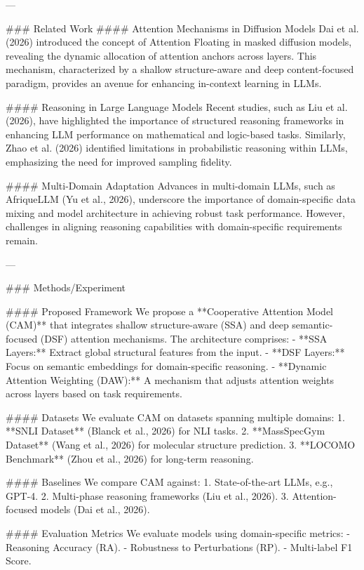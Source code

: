 ---

### Related Work  
#### Attention Mechanisms in Diffusion Models  
Dai et al. (2026) introduced the concept of Attention Floating in masked diffusion models, revealing the dynamic allocation of attention anchors across layers. This mechanism, characterized by a shallow structure-aware and deep content-focused paradigm, provides an avenue for enhancing in-context learning in LLMs.

#### Reasoning in Large Language Models  
Recent studies, such as Liu et al. (2026), have highlighted the importance of structured reasoning frameworks in enhancing LLM performance on mathematical and logic-based tasks. Similarly, Zhao et al. (2026) identified limitations in probabilistic reasoning within LLMs, emphasizing the need for improved sampling fidelity.

#### Multi-Domain Adaptation  
Advances in multi-domain LLMs, such as AfriqueLLM (Yu et al., 2026), underscore the importance of domain-specific data mixing and model architecture in achieving robust task performance. However, challenges in aligning reasoning capabilities with domain-specific requirements remain.

---

### Methods/Experiment  

#### Proposed Framework  
We propose a **Cooperative Attention Model (CAM)** that integrates shallow structure-aware (SSA) and deep semantic-focused (DSF) attention mechanisms. The architecture comprises:  
- **SSA Layers:** Extract global structural features from the input.  
- **DSF Layers:** Focus on semantic embeddings for domain-specific reasoning.  
- **Dynamic Attention Weighting (DAW):** A mechanism that adjusts attention weights across layers based on task requirements.  

#### Datasets  
We evaluate CAM on datasets spanning multiple domains:  
1. **SNLI Dataset** (Blanck et al., 2026) for NLI tasks.  
2. **MassSpecGym Dataset** (Wang et al., 2026) for molecular structure prediction.  
3. **LOCOMO Benchmark** (Zhou et al., 2026) for long-term reasoning.  

#### Baselines  
We compare CAM against:  
1. State-of-the-art LLMs, e.g., GPT-4.  
2. Multi-phase reasoning frameworks (Liu et al., 2026).  
3. Attention-focused models (Dai et al., 2026).  

#### Evaluation Metrics  
We evaluate models using domain-specific metrics:  
- Reasoning Accuracy (RA).  
- Robustness to Perturbations (RP).  
- Multi-label F1 Score.  

